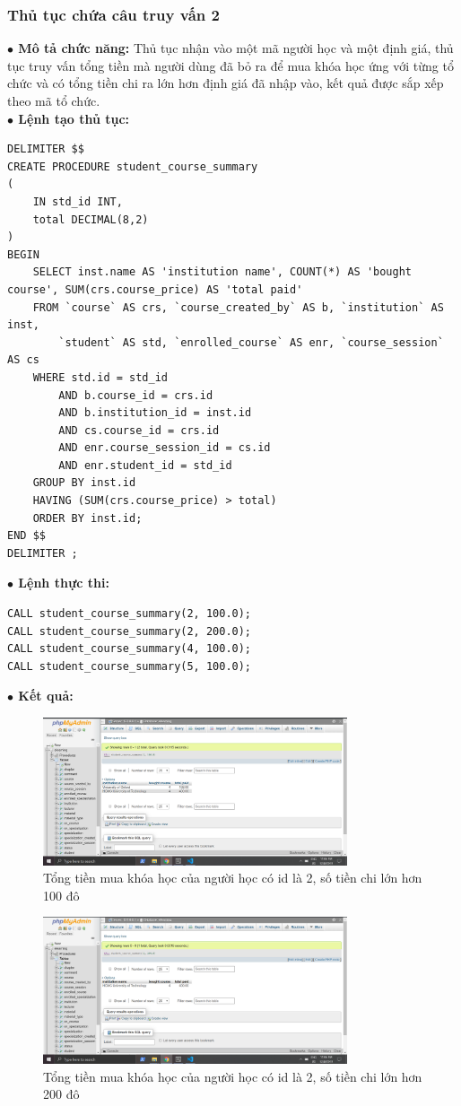 \documentclass[12pt,a4paper,titlepage]{article}
\begin{document}
\subsubsection{Thủ tục chứa câu truy vấn 2}
\textbf{$\bullet$ Mô tả chức năng:} Thủ tục nhận vào một mã người học và một định giá, thủ tục truy vấn tổng tiền mà người dùng đã bỏ ra để mua khóa học ứng với từng tổ chức và có tổng tiền chi ra lớn hơn định giá đã nhập vào, kết quả được sắp xếp theo mã tổ chức.\\
\textbf{$\bullet$ Lệnh tạo thủ tục:}
\begin{lstlisting}
DELIMITER $$
CREATE PROCEDURE student_course_summary
(
    IN std_id INT,
    total DECIMAL(8,2)
)
BEGIN
	SELECT inst.name AS 'institution name', COUNT(*) AS 'bought course', SUM(crs.course_price) AS 'total paid'
	FROM `course` AS crs, `course_created_by` AS b, `institution` AS inst,
        `student` AS std, `enrolled_course` AS enr, `course_session` AS cs
	WHERE std.id = std_id
        AND b.course_id = crs.id
        AND b.institution_id = inst.id
        AND cs.course_id = crs.id
        AND enr.course_session_id = cs.id
        AND enr.student_id = std_id
    GROUP BY inst.id
    HAVING (SUM(crs.course_price) > total)
	ORDER BY inst.id;
END $$
DELIMITER ;
\end{lstlisting}
\textbf{$\bullet$ Lệnh thực thi:}
\begin{lstlisting}
CALL student_course_summary(2, 100.0);
CALL student_course_summary(2, 200.0);
CALL student_course_summary(4, 100.0);
CALL student_course_summary(5, 100.0);
\end{lstlisting}
\textbf{$\bullet$ Kết quả:}
\begin{figure}[h!]
	\centering
	\caption{Tổng tiền mua khóa học của người học có id là 2, số tiền chi lớn hơn 100 đô}
	\includegraphics[width=0.8\textwidth]{images/onehun.png}
\end{figure}
\begin{figure}[h!]
	\centering
	\caption{Tổng tiền mua khóa học của người học có id là 2, số tiền chi lớn hơn 200 đô}
	\includegraphics[width=0.8\textwidth]{images/twohun.png}
\end{figure}
\end{document}
